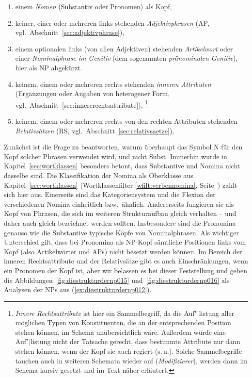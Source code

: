 \begin{enumerate}
  \item einem \textit{Nomen} (Substantiv oder Pronomen) als Kopf,
  \item keiner, einer oder mehreren links stehenden \textit{Adjektivphrasen} (AP, vgl.\ Abschnitt~\ref{sec:adjektivphrase}),
  \item einem optionalen links (von allen Adjektiven) stehenden \textit{Artikelwort} oder einer \textit{Nominalphrase im Genitiv} (dem sogenannten \textit{pränominalen Genitiv}), hier als NP abgekürzt.
\Np
  \item keinem, einem oder mehreren rechts stehenden \textit{inneren Attributen} (Ergänzungen oder Angaben von heterogener Form, vgl.\ Abschnitt~\ref{sec:innererechtsattribute}),%
    \footnote{\textit{Innere Rechtsattribute} ist hier ein Sammelbegriff, da die Auf"|listung aller möglichen Typen von Konstituenten, die an der entsprechenden Position stehen können, im Schema unübersichtlich wäre.
Außerdem würde eine Auf"|listung nicht der Tatsache gerecht, dass bestimmte Attribute nur dann stehen können, wenn der Kopf sie auch regiert (s.\,u.).
Solche Sammelbegriffe tauchen auch in weiteren Schemata wieder auf (\zB \textit{Modifizierer}), werden dann im Schema kursiv gesetzt und im Text näher erläutert.
}
  \item keinem, einem oder mehreren rechts von den rechten Attributen stehenden \textit{Relativsätzen} (RS, vgl.\ Abschnitt~\ref{sec:relativsaetze}),
\end{enumerate}


Zunächst ist die Frage zu beantworten, warum überhaupt das Symbol N für den Kopf solcher Phrasen verwendet wird, und nicht Subst.
Immerhin wurde in Kapitel~\ref{sec:wortklassen} besonders betont, dass Substantive und Nomina nicht dasselbe sind.
Die Klassifikation der Nomina als Oberklasse aus Kapitel~\ref{sec:wortklassen} (Wortklassenfilter \ref{wfilt:verbennomina}, Seite~\pageref{wfilt:verbennomina}) zahlt sich hier aus.
Einerseits sind das Kategoriensystem und die Flexion der verschiedenen Nomina einheitlich bzw.\ ähnlich.
Andererseits fungieren sie als Kopf von Phrasen, die sich im weiteren Strukturaufbau gleich verhalten -- und daher auch gleich bezeichnet werden sollten.
Insbesondere sind die Pronomina genauso wie die Substantive typische Köpfe von Nominalphrasen.
Als wichtiger Unterschied gilt, dass bei Pronomina als NP-Kopf sämtliche Positionen links vom Kopf (also Artikelwörter und APs) nicht besetzt werden können.
Im Bereich der inneren Rechtsattribute und der Relativsätze gibt es auch Einschränkungen, wenn ein Pronomen der Kopf ist, aber wir belassen es bei dieser Feststellung und geben die Abbildungen~\ref{fig:diestrukturdernp015} und~\ref{fig:diestrukturdernp016} als Analysen der NPs aus (\ref{ex:diestrukturdernp012}).

